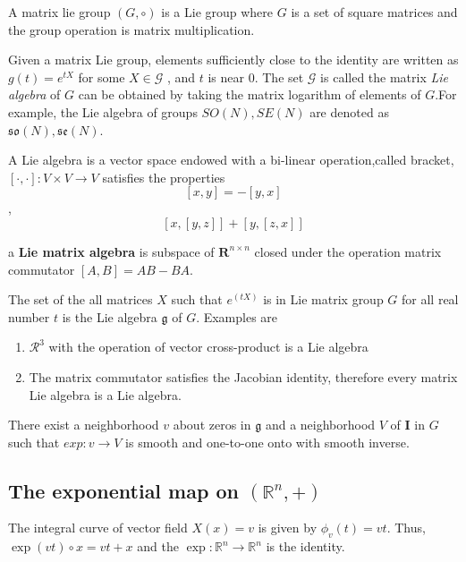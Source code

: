 \begin{refsection}
\begin{definition}
A matrix lie group $(G,\circ)$ is a Lie group where $G$ is a set of square matrices and the group operation is matrix multiplication.
\end{definition}

Given a matrix Lie group, elements sufficiently close to the identity are written as $g(t) = e^{tX}$ for some $X \in \mathcal{G}$ , and $t$ is near 0. The set $\mathcal{G}$ is called the matrix \emph{Lie algebra} of $G$ can be obtained by taking the matrix logarithm of elements of $G$.For example, the Lie algebra of groups $SO(N),SE(N)$ are denoted as $\mathfrak{so}(N),\mathfrak{se}(N)$.

\begin{definition}
A Lie algebra is a vector space endowed with a bi-linear operation,called bracket, $[\cdot,\cdot]: V\times V \rightarrow V$ satisfies the properties $$[x,y] = -[y,x]$$, $$[x,[y,z]] + [y,[z,x]]$$
\end{definition}


\begin{definition}
a \textbf{Lie matrix algebra} is subspace of $\mathbf{R}^{n\times n}$ closed under the operation matrix commutator $[A,B]=AB-BA$.
\end{definition}
The set of the all matrices $X$ such that $e^(tX)$ is in Lie matrix group $G$ for all real number $t$ is the Lie algebra $\mathfrak{g}$ of $G$. 
Examples are 
\begin{enumerate}
\item $\mathcal{R}^3$ with the operation of vector cross-product is a Lie algebra
\item The matrix commutator satisfies the Jacobian identity, therefore every matrix Lie algebra is a Lie algebra.
\end{enumerate}

There exist a neighborhood $v$ about zeros in $\mathfrak{g}$ and a neighborhood $V$ of \textbf{I} in $G$ such that $exp:v \rightarrow V$ is smooth and one-to-one 
onto with smooth inverse.

\subsection{The exponential map on $(\mathbb{R}^n,+)$}
The integral curve of vector field $X(x) = v$ is given by $\phi_v(t) = vt.$ Thus, $\exp(vt)\circ x = vt+x$ and the $\exp: \mathbb{R}^n \rightarrow \mathbb{R}^n$ is the identity.



\end{refsection}
